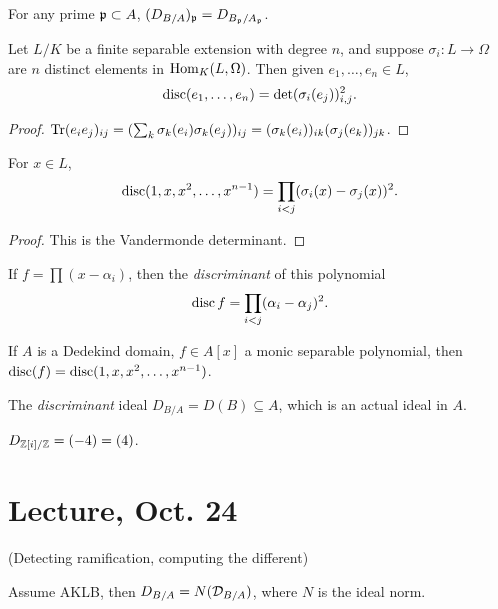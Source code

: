 \documentclass[11pt]{amsart}
\begin{document}
\begin{prop}
For any prime $\mathfrak{p}\subset A$, $(D_{B/A})_{\mathfrak{p}} = D_{B_{\mathfrak{p}}/A_{\mathfrak{p}}}$.
\end{prop}

\begin{prop}
Let $L/K$ be a finite separable extension with degree $n$, and suppose $\sigma_i: L\to \Omega$ are $n$ distinct elements in $\operatorname{Hom}_K(L, \Omega)$. Then given $e_1,\dots,e_n\in L$, 
\[\operatorname{disc}(e_1,\dots,e_n) = \det(\sigma_i(e_j))_{i,j}^2.\]
\end{prop}


\begin{proof}
$\operatorname{Tr}(e_ie_j)_{ij} = (\sum_k \sigma_k(e_i) \sigma_k(e_j))_{ij} = (\sigma_k(e_i))_{ik}(\sigma_j(e_k))_{jk}$.
\end{proof}

\begin{prop}
For $x\in L$, 
\[\operatorname{disc}(1,x,x^2,\dots,x^{n-1}) = \prod_{i<j} (\sigma_i(x) - 
\sigma_j(x))^2.\]
\end{prop}

\begin{proof}
This is the Vandermonde determinant.
\end{proof}

\begin{defn}
If $f = \prod (x-\alpha_i)$, then the \emph{discriminant} of this polynomial 
\[\operatorname{disc} f = \prod_{i<j} (\alpha_i - \alpha_j)^2.\]
\end{defn}

\begin{prop}
If $A$ is a Dedekind domain, $f\in A[x]$ a monic separable polynomial, then $\operatorname{disc}(f) = \operatorname{disc}(1,x,x^2,\dots,x^{n-1})$.
\end{prop}

\begin{defn}
The \emph{discriminant} ideal $D_{B/A} = D(B)\subseteq A$, which is an actual ideal in $A$.
\end{defn}

\begin{exm}
$D_{\mathbb{Z}[i]/\mathbb{Z}} = (-4) = (4)$.
\end{exm}


\section{Lecture, Oct. 24}

(Detecting ramification, computing the different)

\begin{thm}
Assume AKLB, then
$D_{B/A} = N(\mathcal{D}_{B/A})$, where $N$ is the ideal norm.
\end{thm}
\end{document}
